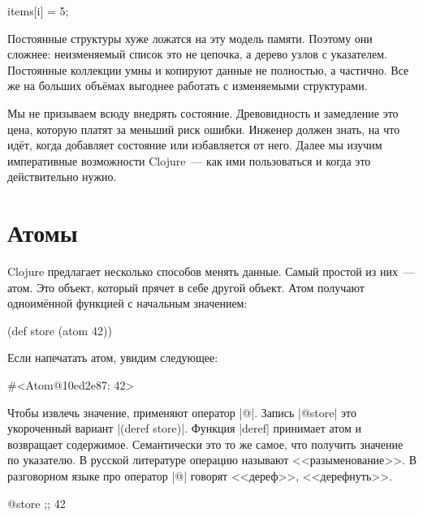 \begin{english}
  \begin{python}
items[i] = 5;
  \end{python}
\end{english}

Постоянные структуры хуже ложатся на эту модель памяти. Поэтому они сложнее:
неизменяемый список это не цепочка, а дерево узлов с указателем. Постоянные
коллекции умны и копируют данные не полностью, а частично. Все же на больших
объ\"{е}мах выгоднее работать с изменяемыми структурами.

Мы не призываем всюду внедрять состояние. Древовидность и замедление это цена,
которую платят за меньший риск ошибки. Инженер должен знать, на что ид\"{е}т, когда
добавляет состояние или избавляется от него. Далее мы изучим императивные
возможности Clojure~--- как ими пользоваться и когда это действительно нужно.

\section{Атомы}

Clojure предлагает несколько способов менять данные. Самый простой из них~---
атом. Это объект, который прячет в себе другой объект. Атом получают одноим\"{е}нной
функцией с начальным значением:

\begin{english}
  \begin{clojure}
(def store (atom 42))
  \end{clojure}
\end{english}

\noindent
Если напечатать атом, увидим следующее:

\begin{english}
  \begin{clojure}
#<Atom@10ed2e87: 42>
  \end{clojure}
\end{english}

Чтобы извлечь значение, применяют оператор \spverb|@|. Запись \spverb|@store|
это укороченный вариант \spverb|(deref store)|. Функция \spverb|deref| принимает
атом и возвращает содержимое. Семантически это то же самое, что получить
значение по указателю. В русской литературе операцию называют
<<разыменование>>. В разговорном языке про оператор \spverb|@| говорят
<<дереф>>, <<дерефнуть>>.

\begin{english}
  \begin{clojure}
@store ;; 42
  \end{clojure}
\end{english}

